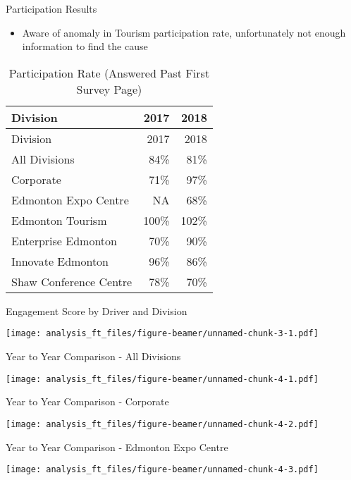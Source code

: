 \documentclass[handout]{beamer}
\providecommand{\tightlist}{%
  \setlength{\itemsep}{0pt}\setlength{\parskip}{0pt}}
\begin{document}
\begin{frame}{Participation Results}
\protect\hypertarget{participation-results}{}

\begin{itemize}
\tightlist
\item
  Aware of anomaly in Tourism participation rate, unfortunately not
  enough information to find the cause
\end{itemize}

\begin{longtable}[]{@{}lrr@{}}
\caption{Participation Rate (Answered Past First Survey
Page)}\tabularnewline
\toprule
Division & 2017 & 2018\tabularnewline
\midrule
\endfirsthead
\toprule
Division & 2017 & 2018\tabularnewline
\midrule
\endhead
All Divisions & 84\% & 81\%\tabularnewline
Corporate & 71\% & 97\%\tabularnewline
Edmonton Expo Centre & NA & 68\%\tabularnewline
Edmonton Tourism & 100\% & 102\%\tabularnewline
Enterprise Edmonton & 70\% & 90\%\tabularnewline
Innovate Edmonton & 96\% & 86\%\tabularnewline
Shaw Conference Centre & 78\% & 70\%\tabularnewline
\bottomrule
\end{longtable}

\end{frame}

\begin{frame}{Engagement Score by Driver and Division}
\protect\hypertarget{engagement-score-by-driver-and-division}{}

\texttt{[image: analysis\_ft\_files/figure-beamer/unnamed-chunk-3-1.pdf]}

\end{frame}

\begin{frame}{Year to Year Comparison - All Divisions}
\protect\hypertarget{year-to-year-comparison---all-divisions}{}

\texttt{[image: analysis\_ft\_files/figure-beamer/unnamed-chunk-4-1.pdf]}

\end{frame}

\begin{frame}{Year to Year Comparison - Corporate}
\protect\hypertarget{year-to-year-comparison---corporate}{}

\texttt{[image: analysis\_ft\_files/figure-beamer/unnamed-chunk-4-2.pdf]}

\end{frame}

\begin{frame}{Year to Year Comparison - Edmonton Expo Centre}
\protect\hypertarget{year-to-year-comparison---edmonton-expo-centre}{}

\texttt{[image: analysis\_ft\_files/figure-beamer/unnamed-chunk-4-3.pdf]}

\end{frame}
\end{document}
